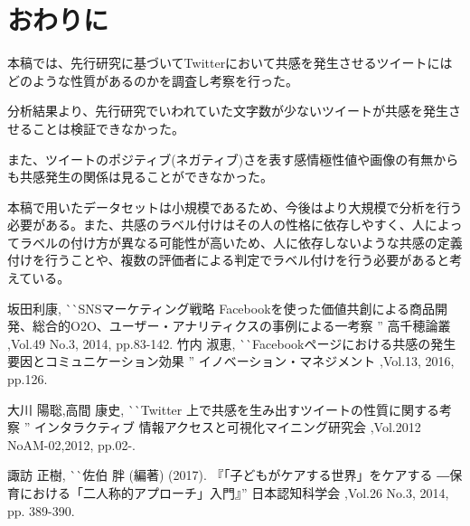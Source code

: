 \documentclass[dvipdfmx]{issj}
\begin{document}
\section{おわりに}  %

本稿では、先行研究に基づいてTwitterにおいて共感を発生させるツイートにはどのような性質があるのかを調査し考察を行った。

分析結果より、先行研究でいわれていた文字数が少ないツイートが共感を発生させることは検証できなかった。

また、ツイートのポジティブ(ネガティブ)さを表す感情極性値や画像の有無からも共感発生の関係は見ることができなかった。

本稿で用いたデータセットは小規模であるため、今後はより大規模で分析を行う必要がある。また、共感のラベル付けはその人の性格に依存しやすく、人によってラベルの付け方が異なる可能性が高いため、人に依存しないような共感の定義付けを行うことや、複数の評価者による判定でラベル付けを行う必要があると考えている。





\begin{thebibliography}{99}


   坂田利康, 
                       ^^ ^^ SNSマーケティング戦略 Facebookを使った価値共創による商品開発、総合的O2O、ユーザー・アナリティクスの事例による一考察 '' 
                       高千穂論叢 ,Vol.49 No.3, 2014, pp.83-142.
    竹内 淑恵, 
                       ^^ ^^ Facebookページにおける共感の発生要因とコミュニケーション効果 '' 
                       イノベーション・マネジメント ,Vol.13, 2016, pp.126.

    大川 陽聡,高間 康史, 
                       ^^ ^^ Twitter 上で共感を生み出すツイートの性質に関する考察 '' 
                       インタラクティブ 情報アクセスと可視化マイニング研究会 ,Vol.2012 NoAM-02,2012, pp.02-.



   諏訪 正樹,
                       ^^ ^^ 佐伯 胖 (編著) (2017). 『「子どもがケアする世界」をケアする ―保育における「二人称的アプローチ」入門』'' 
                       日本認知科学会 ,Vol.26 No.3, 2014, pp. 389-390.


\end{thebibliography}
\end{document}
